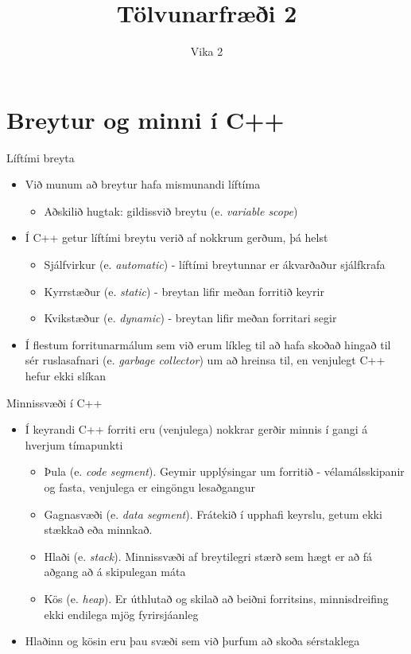 \documentclass[handout]{beamer}
\title{Tölvunarfræði 2}
\subtitle{Vika 2}
\begin{document}
\begin{frame}
\titlepage
\end{frame}

\section{Breytur og minni í C++}

\begin{frame}{Líftími breyta}
\begin{itemize}
 \item Við munum að breytur hafa mismunandi líftíma
 \begin{itemize}
  \item Aðskilið hugtak: gildissvið breytu (e. \emph{variable scope})
 \end{itemize}
 \item Í C++ getur líftími breytu verið af nokkrum gerðum, þá helst
 \begin{itemize}
  \item Sjálfvirkur (e. \emph{automatic}) - líftími breytunnar er ákvarðaður sjálfkrafa
  \item Kyrrstæður (e. \emph{static}) - breytan lifir meðan forritið keyrir
  \item Kvikstæður (e. \emph{dynamic}) - breytan lifir meðan forritari segir
 \end{itemize}
 \item Í flestum forritunarmálum sem við erum líkleg til að hafa skoðað hingað til sér ruslasafnari (e. \emph{garbage collector}) um að hreinsa til, en venjulegt C++ hefur ekki slíkan
\end{itemize}
\end{frame}

\begin{frame}{Minnissvæði í C++}
\begin{itemize}
 \item Í keyrandi C++ forriti eru (venjulega) nokkrar gerðir minnis í gangi á hverjum tímapunkti
 \begin{itemize}
  \item Þula (e. \emph{code segment}). Geymir upplýsingar um forritið - vélamálsskipanir og fasta, venjulega er eingöngu lesaðgangur
  \item Gagnasvæði (e. \emph{data segment}).
  Frátekið í upphafi keyrslu, getum ekki stækkað eða minnkað.
  \item Hlaði (e. \emph{stack}). Minnissvæði af breytilegri stærð sem hægt er að fá aðgang að á skipulegan máta
  \item Kös (e. \emph{heap}). Er úthlutað og skilað að beiðni forritsins, minnisdreifing ekki endilega mjög fyrirsjáanleg
 \end{itemize}
 \item Hlaðinn og kösin eru þau svæði sem við þurfum að skoða sérstaklega
\end{itemize}
\end{frame}
\end{document}

